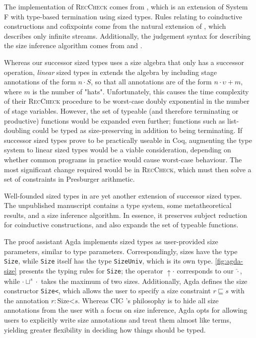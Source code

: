 \documentclass[acmsmall,screen,review,10pt]{acmart} %
\begin{document}
The implementation of \textsc{RecCheck} comes from \Fhat \cite{f-hat}, which is an extension of System F with type-based termination using sized types. Rules relating to coinductive constructions and cofixpoints come from the natural extension of \CChatomega \cite{cc-hat-omega}, which describes only infinite streams. Additionally, the judgement syntax for describing the size inference algorithm comes from \CChatomega and \CIChatl \cite{cic-hat-l}.

Whereas our successor sized types uses a size algebra that only has a successor operation, \textit{linear} sized types in \CIChatl extends the algebra by including stage annotations of the form $n \cdot S$, so that all annotations are of the form $n \cdot \upsilon + m$, where $m$ is the number of "hats". Unfortunately, this causes the time complexity of their \textsc{RecCheck} procedure to be worst-case doubly exponential in the number of stage variables. However, the set of typeable (and therefore terminating or productive) functions would be expanded even further; functions such as list-doubling could be typed as size-preserving in addition to being terminating. If successor sized types prove to be practically useable in Coq, augmenting the type system to linear sized types would be a viable consideration, depending on whether common programs in practice would cause worst-case behaviour. The most significant change required would be in \textsc{RecCheck}, which must then solve a set of constraints in Presburger arithmetic.

Well-founded sized types in \CIChatsub \cite{wellfounded} are yet another extension of successor sized types. The unpublished manuscript contains a type system, some metatheoretical results, and a size inference algorithm. In essence, it preserves subject reduction for coinductive constructions, and also expands the set of typeable functions.



The proof assistant Agda implements sized types as user-provided size parameters, similar to type parameters. Correspondingly, sizes have the type \texttt{Size}, while \texttt{Size} itself has the type \texttt{SizeUniv}, which is its own type. \autoref{fig:agda-size} presents the typing rules for \texttt{Size}; the operator $\uparrow \cdot$ corresponds to our $\hat{\cdot}$, while $\cdot \sqcup^s \cdot$ takes the maximum of two sizes. Additionally, Agda defines the size constructor \texttt{Size<}, which allows the user to specify a size constraint $r \sqsubseteq s$ with the annotation $r: \text{Size<} s$. Whereas CIC$\widehat{~}\,$'s philosophy is to hide all size annotations from the user with a focus on size inference, Agda opts for allowing users to explicitly write size annotations and treat them almost like terms, yielding greater flexibility in deciding how things should be typed.
\end{document}

